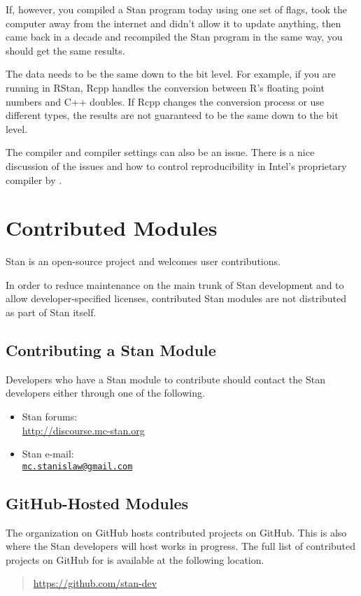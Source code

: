 If, however, you compiled a Stan program today using one set of flags,
took the computer away from the internet and didn't allow it to update
anything, then came back in a decade and recompiled the Stan program
in the same way, you should get the same results.

The data needs to be the same down to the bit level. For example, if
you are running in RStan, Rcpp handles the conversion between R's
floating point numbers and C++ doubles. If Rcpp changes the conversion
process or use different types, the results are not guaranteed to be
the same down to the bit level.

The compiler and compiler settings can also be an issue.  There is a
nice discussion of the issues and how to control reproducibility in
Intel's proprietary compiler by \cite{CordenKreitzer:2014}.



\chapter{Contributed Modules}

\noindent
Stan is an open-source project and welcomes user contributions.

In order to reduce maintenance on the main trunk of Stan development
and to allow developer-specified licenses, contributed Stan modules
are not distributed as part of Stan itself.


\section{Contributing a Stan Module}

Developers who have a Stan module to contribute should contact the
Stan developers either through one of the following.
%
\begin{itemize}
\item Stan forums: \
\\
\url{http://discourse.mc-stan.org}
\item Stan e-mail: \
\\
\href{mailto:mc.stanislaw@gmail.com}{\tt mc.stanislaw@gmail.com}
\end{itemize}


\section{GitHub-Hosted Modules}

The  organization on GitHub hosts contributed projects
on GitHub.  This is also where the Stan developers will host works in
progress.  The full list of contributed projects on GitHub for
\code{stan-dev} is available at the following location.
%
\begin{quote}
\url{https://github.com/stan-dev}
\end{quote}

